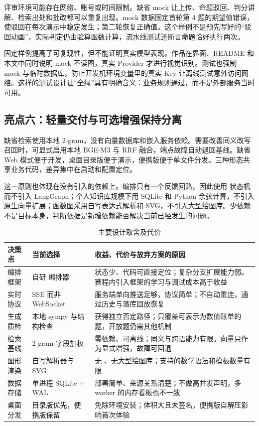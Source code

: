 评审环境可能存在网络、账号或时间限制。缺省 mock 让上传、命题驳回、判分讲解、检索出处和批改都可以重复出现。mock 数据固定首轮第 4 题的期望值错误，使驳回在每次演示中稳定发生；第二轮恢复正确值。这个样例不是预先写好的“驳回动画”，实际判定仍由验算函数计算，流水线测试还断言命题恰好执行两次。

固定样例提高了可复现性，但不能证明真实模型表现。作品在界面、README 和本文中同时说明 mock 不读图，真实 Provider 才进行视觉识别。测试也强制 mock 与临时数据库，防止开发机环境变量里的真实 Key 让离线测试意外访问网络。这样的测试设计让“全绿”具有明确含义：业务规则通过，而不是外部服务当时可用。

\subsection{亮点六：轻量交付与可选增强保持分离}

缺省检索使用本地 2-gram，没有向量数据库和嵌入服务依赖。需要改善同义改写召回时，可显式启用本地 BGE-M3 与 RRF 融合，端点故障自动退回基线。缺省 Web 模式便于开发，桌面目录版便于演示，便携版便于单文件分发。三种形态共享业务代码，差异集中在启动和配置定位。

这一原则也体现在没有引入的依赖上。编排只有一个反馈回路，因此使用  状态机而不引入 LangGraph；个人知识库规模下用 SQLite 和 Python 余弦计算，不引入原生向量扩展；函数图采用自写表达式解析和 SVG，不引入大型绘图库。少依赖不是目标本身，判断依据是新增依赖能否解决当前已经发生的问题。

\begin{table}[H]
\centering\footnotesize
\caption{主要设计取舍及代价}
\begin{tabularx}{\textwidth}{@{}L{2.8cm}L{4.3cm}Y@{}}
\toprule
\textbf{决策点} & \textbf{当前选择} & \textbf{收益、代价与放弃方案的原因} \\
\midrule
编排框架 & 自研  编排器 & 状态少、代码可直接定位；复杂分支扩展能力弱。赛程内引入框架的学习与调试成本高于收益 \\
实时协议 & SSE 而非 WebSocket & 服务端单向推送足够，协议简单；不自动重连，通过历史与落库回放恢复 \\
生成质检 & 本地 sympy 与结构检查 & 获得独立否定路径；只覆盖可表示为数值账单的题，开放题仍需其他机制 \\
检索基线 & 2-gram 字段加权 & 零依赖、可离线；同义与跨语能力有限。向量只作为显式增强，故障可回退 \\
图形渲染 & 自写解析器与 SVG & 无 、无大型绘图库；支持的数学语法和模板数量有限 \\
数据存储 & 单进程 SQLite + WAL & 部署简单、来源关系清楚；不做高并发声明，多 worker 的内存看板也不一致 \\
桌面分发 & 目录版优先，便携版保留 & 免除环境安装；体积大且未签名，便携版自解压影响首次体验 \\
\bottomrule
\end{tabularx}
\end{table}

